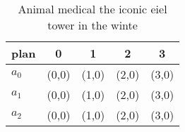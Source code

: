 \documentclass[a4paper]{article}
\begin{document}
\begin{table}
\begin{adjustbox}{width=0.6\columnwidth}
\begin{tabular}{|l|l|l|l|l|}
\hline
\textbf{plan} & \multicolumn{1}{c|}{\textbf{0}} & \multicolumn{1}{c|}{\textbf{1}} & \multicolumn{1}{c|}{\textbf{2}} & \multicolumn{1}{c|}{\textbf{3}} \\ \hline
\textbf{$a_0$}  & (0,0) & (1,0) & (2,0) & (3,0) \\ \hline
\textbf{$a_1$}  & (0,0) & (1,0) & (2,0) & (3,0) \\ \hline
\textbf{$a_2$}  & (0,0) & (1,0) & (2,0) & (3,0) \\ \hline
\end{tabular}
\end{adjustbox}
\caption{Animal medical the iconic eiel tower in the winte
}
\end{table}
\end{document}
